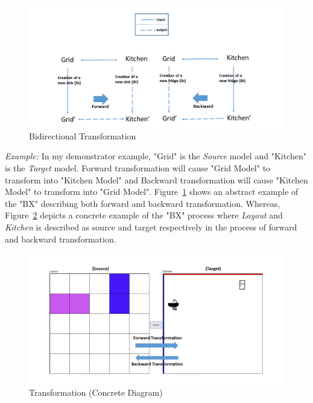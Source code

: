 \begin{figure}
	\includegraphics[width=1\textwidth]{figures/BX}
	\caption{Bidirectional Transformation}
	\label{fig:BX_Diagram}
\end{figure}

\textit{Example:} In my demonstrator example, "Grid" is the \textit{Source} model and "Kitchen" is the \textit{Target} model. Forward transformation will cause "Grid Model" to transform into "Kitchen Model" and Backward transformation will cause "Kitchen Model" to transform into "Grid Model".
Figure~\ref{fig:BX_Diagram} shows an abstract example of the "BX" describing both forward and backward transformation. Whereas, Figure~\ref{fig:Transformation_Concrete} depicts a concrete example of the "BX" process where \textit{Layout} and \textit{Kitchen} is described as source and target respectively in the process of forward and backward transformation.

\begin{figure}
	\includegraphics[width=1\textwidth]{figures/Transformation_Concrete}
	\caption{Transformation (Concrete Diagram)}
	\label{fig:Transformation_Concrete}
\end{figure}
